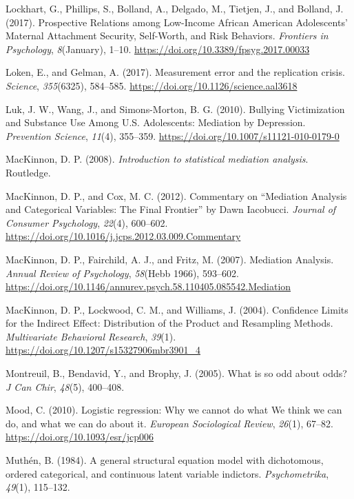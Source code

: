 \documentclass[]{DissertateUSU}
\begin{document}
\hypertarget{ref-Lockhart2017}{}
Lockhart, G., Phillips, S., Bolland, A., Delgado, M., Tietjen, J., and
Bolland, J. (2017). Prospective Relations among Low-Income African
American Adolescents' Maternal Attachment Security, Self-Worth, and Risk
Behaviors. \emph{Frontiers in Psychology}, \emph{8}(January), 1--10.
\url{https://doi.org/10.3389/fpsyg.2017.00033}

\hypertarget{ref-Loken2017}{}
Loken, E., and Gelman, A. (2017). Measurement error and the replication
crisis. \emph{Science}, \emph{355}(6325), 584--585.
\url{https://doi.org/10.1126/science.aal3618}

\hypertarget{ref-Luk2010}{}
Luk, J. W., Wang, J., and Simons-Morton, B. G. (2010). Bullying
Victimization and Substance Use Among U.S. Adolescents: Mediation by
Depression. \emph{Prevention Science}, \emph{11}(4), 355--359.
\url{https://doi.org/10.1007/s11121-010-0179-0}

\hypertarget{ref-mackinnon2008intro}{}
MacKinnon, D. P. (2008). \emph{Introduction to statistical mediation
analysis}. Routledge.

\hypertarget{ref-MacKinnon2012}{}
MacKinnon, D. P., and Cox, M. C. (2012). Commentary on ``Mediation
Analysis and Categorical Variables: The Final Frontier'' by Dawn
Iacobucci. \emph{Journal of Consumer Psychology}, \emph{22}(4),
600--602. \url{https://doi.org/10.1016/j.jcps.2012.03.009.Commentary}

\hypertarget{ref-MacKinnon2007}{}
MacKinnon, D. P., Fairchild, A. J., and Fritz, M. (2007). Mediation
Analysis. \emph{Annual Review of Psychology}, \emph{58}(Hebb 1966),
593--602.
\url{https://doi.org/10.1146/annurev.psych.58.110405.085542.Mediation}

\hypertarget{ref-MacKinnon2004}{}
MacKinnon, D. P., Lockwood, C. M., and Williams, J. (2004). Confidence
Limits for the Indirect Effect: Distribution of the Product and
Resampling Methods. \emph{Multivariate Behavioral Research},
\emph{39}(1). \url{https://doi.org/10.1207/s15327906mbr3901_4}

\hypertarget{ref-Montreuil2005}{}
Montreuil, B., Bendavid, Y., and Brophy, J. (2005). What is so odd about
odds? \emph{J Can Chir}, \emph{48}(5), 400--408.

\hypertarget{ref-Mood2010}{}
Mood, C. (2010). Logistic regression: Why we cannot do what We think we
can do, and what we can do about it. \emph{European Sociological
Review}, \emph{26}(1), 67--82. \url{https://doi.org/10.1093/esr/jcp006}

\hypertarget{ref-Muthen1984}{}
Muthén, B. (1984). A general structural equation model with dichotomous,
ordered categorical, and continuous latent variable indictors.
\emph{Psychometrika}, \emph{49}(1), 115--132.
\end{document}

